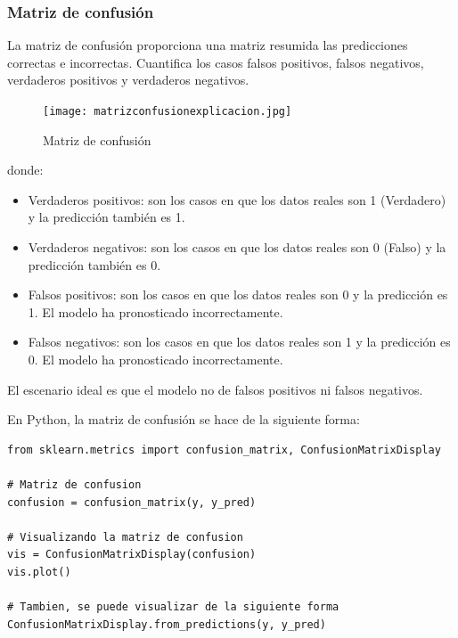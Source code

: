 \documentclass[a4paper, 12pt]{book}
\begin{document}
\subsubsection{Matriz de confusión}
La matriz de confusión proporciona una matriz resumida las predicciones correctas e incorrectas. Cuantifica los casos falsos positivos, falsos negativos, verdaderos positivos y verdaderos negativos.
\begin{figure}[H] 
	\centering 
	\texttt{[image: matrizconfusionexplicacion.jpg]}
	\caption{Matriz de confusión}
\end{figure}
donde:
\begin{itemize}
	\item Verdaderos positivos: son los casos en que los datos reales son 1 (Verdadero) y la predicción también es 1.
	\item Verdaderos negativos: son los casos en que los datos reales son 0 (Falso) y la predicción también es 0.
	\item Falsos positivos: son los casos en que los datos reales son 0 y la predicción es 1. El modelo ha pronosticado incorrectamente.
	\item Falsos negativos: son los casos en que los datos reales son 1 y la predicción es 0. El modelo ha pronosticado incorrectamente.
\end{itemize}
El escenario ideal es que el modelo no de falsos positivos ni falsos negativos.

En Python, la matriz de confusión se hace de la siguiente forma:
\begin{verbatim}
from sklearn.metrics import confusion_matrix, ConfusionMatrixDisplay
	
# Matriz de confusion
confusion = confusion_matrix(y, y_pred)
	
# Visualizando la matriz de confusion
vis = ConfusionMatrixDisplay(confusion)
vis.plot()
	
# Tambien, se puede visualizar de la siguiente forma
ConfusionMatrixDisplay.from_predictions(y, y_pred)
\end{verbatim}
\end{document}
